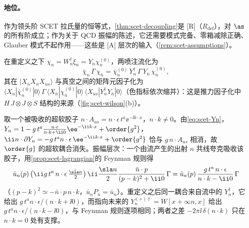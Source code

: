 \paragraph{地位。}作为领头阶 SCET 拉氏量的恒等式，\cref{thm:scet-decoupling}是 [R]（$R_{\mathrm{def}}$），对 $\as$ 的所有阶成立；作为关于 QCD 振幅的陈述，它还需要模式完备、零箱减除正确、Glauber 模式不起作用——这些是 [A] 层次的输入（\cref{rem:scet-assumptions}）。

在重定义之下 $\chi_n=W_n^\dagger\xi_n=Y_n\chi^{(0)}_n$，两喷注流化为
\begin{equation}\label{eq:scet-JY}
\bar\chi_n\,\Gamma\,\chi_{\bar n}=\bar\chi^{(0)}_n\,Y_n^\dagger\,\Gamma\,Y_{\bar n}\,\chi^{(0)}_{\bar n},
\end{equation}
其在 $|X_nX_{\bar n}X_{us}\rangle$ 与真空之间的矩阵元因子化为 $\langle X_n|\bar\chi^{(0)}_n|0\rangle\,\Gamma\,\langle X_{\bar n}|\chi^{(0)}_{\bar n}|0\rangle\,\langle X_{us}|Y_n^\dagger Y_{\bar n}|0\rangle$（色指标依次缩并）：这是推力因子化中 $H\,J\otimes J\otimes S$ 结构的来源（\cref{fig:scet-wilson}(b)）。

\begin{example}\label{ex:scet-decoupling-tree}
取一个被吸收的超软胶子 $n\cdot A_{us}=n\cdot\epsilon\,t^a\ee^{-\ii k\cdot x}$，$n\cdot k\neq0$。由\cref{eq:scet-Yn}，$Y_n=1-g\,t^a\frac{n\cdot\epsilon}{n\cdot k+\ii0}\ee^{-\ii k\cdot x}+\order{g^2}$，$\ii n\cdot\partial Y_n=-g\,t^an\cdot\epsilon\,\ee^{-\ii k\cdot x}+\order{g^2}$ 恰与 $g\,n\cdot A_{us}$ 相消，故 $\order{g}$ 的超软耦合消失。振幅层次：一个由流产生的出射 $n$ 共线夸克吸收该胶子，用\cref{prop:scet-lagrangian}的 Feynman 规则得
\[
\bar u_n(p)\,\big(\ii g\,t^a\,n\cdot\epsilon\,\tfrac{\bar{\sla n}}{2}\big)\,\ii\frac{\sla n}{2}\frac{\bar n\cdot p}{(p-k)^2+\ii0}\,\Gamma=\bar u_n(p)\,\frac{g\,t^a\,n\cdot\epsilon}{n\cdot k-\ii0}\,\Gamma
\]
（$(p-k)^2\simeq-\bar n\cdot p\,n\cdot k$，$\bar u_nP_{\bar n}=\bar u_n$）。重定义之后同一耦合来自流中的 $Y_n^\dagger$，它给出 $g\,t^a n\cdot\epsilon/(n\cdot k+\ii0)$，而指向未来的 $Y_n^{(+)\dagger}=W[x+\infty n,x]$ 给出 $g\,t^an\cdot\epsilon/(n\cdot k-\ii0)$，与 Feynman 规则逐项相同；两者之差 $-2\pi\ii\,\delta(n\cdot k)$ 只在 $n\cdot k=0$ 处有支撑。%
\end{example}


